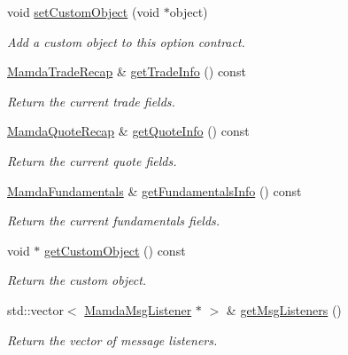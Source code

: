 \begin{CompactItemize}
void \hyperlink{classWombat_1_1MamdaOptionContract_302fbffec136a686aea50d41d31bbb33}{set\-Custom\-Object} (void $\ast$object)
\begin{CompactList}\small\item\em Add a custom object to this option contract. \item\end{CompactList}\item 
\hyperlink{classWombat_1_1MamdaTradeRecap}{Mamda\-Trade\-Recap} \& \hyperlink{classWombat_1_1MamdaOptionContract_e360b5e6125af8ad145f2b4a36026d83}{get\-Trade\-Info} () const 
\begin{CompactList}\small\item\em Return the current trade fields. \item\end{CompactList}\item 
\hyperlink{classWombat_1_1MamdaQuoteRecap}{Mamda\-Quote\-Recap} \& \hyperlink{classWombat_1_1MamdaOptionContract_722ecf29d9ca868a8005ee3bf97530f9}{get\-Quote\-Info} () const 
\begin{CompactList}\small\item\em Return the current quote fields. \item\end{CompactList}\item 
\hyperlink{classWombat_1_1MamdaFundamentals}{Mamda\-Fundamentals} \& \hyperlink{classWombat_1_1MamdaOptionContract_88dec6f0eef0533a71228f2c0be807c0}{get\-Fundamentals\-Info} () const 
\begin{CompactList}\small\item\em Return the current fundamentals fields. \item\end{CompactList}\item 
void $\ast$ \hyperlink{classWombat_1_1MamdaOptionContract_b9989c238b0505570c490d69ada86630}{get\-Custom\-Object} () const 
\begin{CompactList}\small\item\em Return the custom object. \item\end{CompactList}\item 
std::vector$<$ \hyperlink{classWombat_1_1MamdaMsgListener}{Mamda\-Msg\-Listener} $\ast$ $>$ \& \hyperlink{classWombat_1_1MamdaOptionContract_dda8149cad3a048b3ebf56f0f5fb0a1c}{get\-Msg\-Listeners} ()
\begin{CompactList}\small\item\em Return the vector of message listeners. \item\end{CompactList}\item 

\end{CompactItemize}
